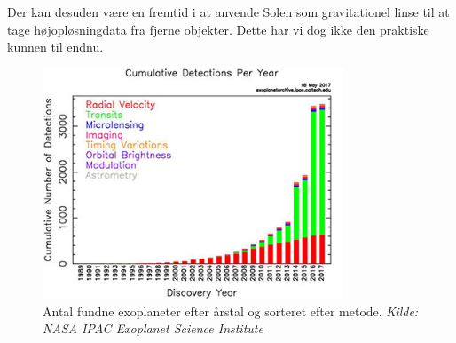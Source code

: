 Der kan desuden være en fremtid i at anvende Solen som gravitationel linse til at tage højopløsningdata fra fjerne objekter. Dette har vi dog ikke den praktiske kunnen til endnu.




\begin{figure}[h!]
    \centering
    \includegraphics[width = 0.8\textwidth]{Astrofysik/billeder/AntalFundne.jpg}  
    \caption{Antal fundne exoplaneter efter årstal og sorteret efter metode. \textit{Kilde: NASA IPAC Exoplanet Science Institute}}
    \label{antal_fundne}
\end{figure}

